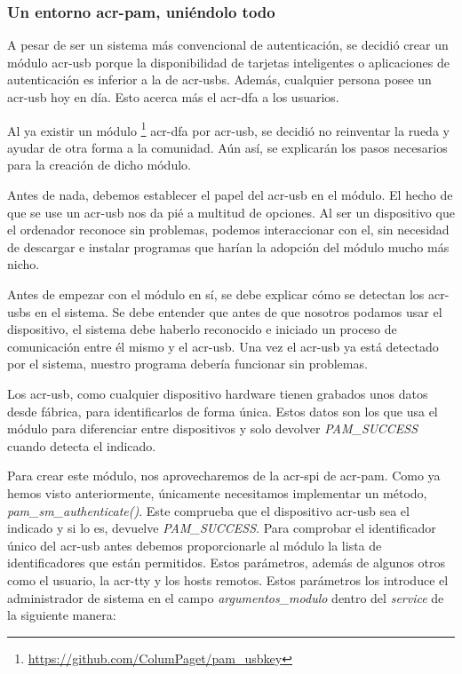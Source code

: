 \documentclass[titlepage, 12pt, a4paper]{article}
\begin{document}
{\subsubsection{Un entorno \gls{acr-pam}, uniéndolo todo}
A pesar de ser un sistema más convencional de autenticación, se decidió crear un módulo \gls{acr-usb} porque la disponibilidad de tarjetas inteligentes o aplicaciones de autenticación es inferior a la de \gls{acr-usb}s. Además, cualquier persona posee un \gls{acr-usb} hoy en día. Esto acerca más el \gls{acr-dfa} a los usuarios. \par
Al ya existir un módulo \footnote{\url{https://github.com/ColumPaget/pam_usbkey}} \gls{acr-dfa} por \gls{acr-usb}, se decidió no reinventar la rueda y ayudar de otra forma a la comunidad. Aún así, se explicarán los pasos necesarios para la creación de dicho módulo. \par
Antes de nada, debemos establecer el papel del \gls{acr-usb} en el módulo. El hecho de que se use un \gls{acr-usb} nos da pié a multitud de opciones. Al ser un dispositivo que el ordenador reconoce sin problemas, podemos interaccionar con el, sin necesidad de descargar e instalar programas que harían la adopción del módulo mucho más nicho.\par
Antes de empezar con el módulo en sí, se debe explicar cómo se detectan los \gls{acr-usb}s en el sistema. Se debe entender que antes de que nosotros podamos usar el dispositivo, el sistema debe haberlo reconocido e iniciado un proceso de comunicación entre él mismo y el \gls{acr-usb}. Una vez el \gls{acr-usb} ya está detectado por el sistema, nuestro programa debería funcionar sin problemas.\par
Los \gls{acr-usb}, como cualquier dispositivo hardware tienen grabados unos datos desde fábrica, para identificarlos de forma única. Estos datos son los que usa el módulo para diferenciar entre dispositivos y solo devolver \textit{PAM\_SUCCESS} cuando detecta el indicado.\par
Para crear este módulo, nos aprovecharemos de la \gls{acr-spi} de \gls{acr-pam}. Como ya hemos visto anteriormente, únicamente necesitamos implementar un método, \textit{pam\_sm\_authenticate()}. Este comprueba que el dispositivo \gls{acr-usb} sea el indicado y si lo es, devuelve \textit{PAM\_SUCCESS}. 
Para comprobar el identificador único del \gls{acr-usb} antes debemos proporcionarle al módulo la lista de identificadores que están permitidos. Estos parámetros, además de algunos otros como el usuario, la \gls{acr-tty} y los hosts remotos. Estos parámetros los introduce el administrador de sistema en el campo \textit{argumentos\_modulo} dentro del \textit{service} de la siguiente manera:
}
\end{document}
